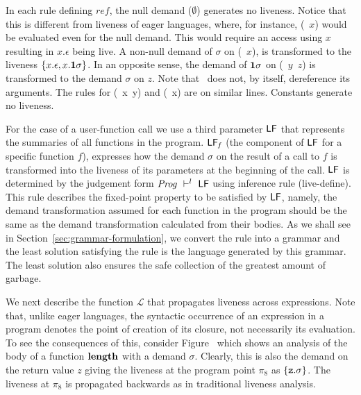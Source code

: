 \documentclass[9pt]{sigplanconf}
\begin{document}
 In each  rule defining $\mathit{ref}$, the  null demand ($\emptyset$)
 generates no  liveness.  Notice that this is  different from liveness
 of  eager  languages,  where,   for  instance,  (\CDR~$x$)  would  be
 evaluated  even for  the null  demand. This  would require  an access
 using $x$ resulting in  $x.\epsilon$ being live.  A non-null demand of
 $\sigma$ on (\CDR~$x$), is transformed to the liveness $\{x.\epsilon,
 x.\mathbf{1}\sigma\}$.  In an opposite  sense, the demand of $\mathbf{1}\sigma$
 on  (\CONS~$y$~$z$) is  transformed to  the demand  $\sigma$  on $z$.
 Note that \CONS\ does not,  by itself, dereference its arguments. The
 rules for (\PRIM~x~y) and  (\NULLQ~x) are on similar lines. Constants
 generate no liveness.

For  the  case  of a  user-function  call  we  use a  third  parameter
$\mathsf{LF}$  that  represents the  summaries  of  all  functions in  the
program.   $\mathsf{LF}_{\mathit f}$  (the  component of  $\mathsf{LF}$ for  a
specific  function $f$),  expresses  how the  demand  $\sigma$ on  the
result  of a  call to  $f$  is transformed  into the  liveness of  its
parameters at the  beginning of the call.  $\mathsf{LF}$  is determined by
the judgement  form $\mathit{Prog} \ \vdash^l\  \mathsf{LF}$  using inference rule
({\sc live-define}).  This rule  describes the fixed-point property to
be satisfied  by $\mathsf{LF}$, namely, the  demand transformation assumed
for each  function in  the program  should be the  same as  the demand
transformation  calculated from  their  bodies.  As  we  shall see  in
Section~\ref{sec:grammar-formulation},  we  convert  the rule  into  a
grammar and  the least  solution satisfying the  rule is  the language
generated by this  grammar.  The least solution also  ensures the safe
collection of the greatest amount of garbage.

We next  describe the function $\mathcal{L}$  that propagates liveness
across expressions.  Note that,  unlike eager languages, the syntactic
occurrence  of an expression  in a  program denotes  the point  of
creation of its closure, not necessarily its evaluation.
To see the  consequences of this, consider
Figure~\cite{fig:mot-example2} which shows an analysis  of the body of
a function $\mathbf{length}$ with a demand $\sigma$.  Clearly, this is also the
demand on the return value $z$ giving the liveness at the program point
$\pi_8$ as $\{\mbox{\tt z}.\sigma\}$.  The liveness at $\pi_8$ is propagated
backwards as in traditional liveness analysis.
\end{document}
